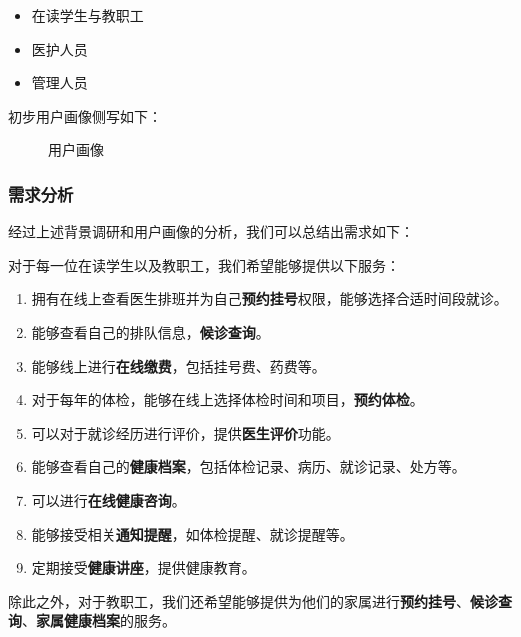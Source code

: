 \documentclass{article}
\begin{document}
\begin{itemize}[itemsep=0.01em]
    \item 在读学生与教职工
    \item 医护人员
    \item 管理人员
\end{itemize}

初步用户画像侧写如下：

\begin{figure}[h]
    \centering
    \caption{用户画像}
\end{figure}

\subsubsection{需求分析}

经过上述背景调研和用户画像的分析，我们可以总结出需求如下：
\vspace{0.5cm}

对于每一位在读学生以及教职工，我们希望能够提供以下服务：
\begin{enumerate}[itemsep=0.01em]
    \item 拥有在线上查看医生排班并为自己\textbf{预约挂号}权限，能够选择合适时间段就诊。
    \item 能够查看自己的排队信息，\textbf{候诊查询}。
    \item 能够线上进行\textbf{在线缴费}，包括挂号费、药费等。
    \item 对于每年的体检，能够在线上选择体检时间和项目，\textbf{预约体检}。
    \item 可以对于就诊经历进行评价，提供\textbf{医生评价}功能。
    \item 能够查看自己的\textbf{健康档案}，包括体检记录、病历、就诊记录、处方等。
    \item 可以进行\textbf{在线健康咨询}。
    \item 能够接受相关\textbf{通知提醒}，如体检提醒、就诊提醒等。
    \item 定期接受\textbf{健康讲座}，提供健康教育。
\end{enumerate}

除此之外，对于教职工，我们还希望能够提供为他们的家属进行\textbf{预约挂号}、\textbf{候诊查询}、\textbf{家属健康档案}的服务。
\end{document}
